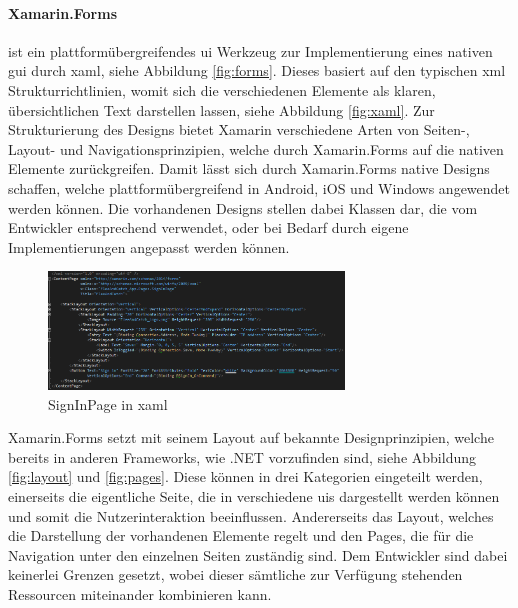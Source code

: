 \paragraph{Xamarin.Forms} ist ein plattformübergreifendes \gls{ui} Werkzeug zur Implementierung eines nativen \gls{gui} durch \gls{xaml}, siehe Abbildung \eqref{fig:forms}. Dieses basiert auf den typischen \gls{xml} Strukturrichtlinien, womit sich die verschiedenen Elemente als klaren, übersichtlichen Text darstellen lassen, siehe Abbildung \eqref{fig:xaml}. Zur Strukturierung des Designs bietet Xamarin verschiedene Arten von Seiten-, Layout- und Navigationsprinzipien, welche durch Xamarin.Forms auf die nativen Elemente zurückgreifen. Damit lässt sich durch Xamarin.Forms native Designs schaffen, welche plattformübergreifend in Android, iOS und Windows angewendet werden können. Die vorhandenen Designs stellen dabei Klassen dar, die vom Entwickler entsprechend verwendet, oder bei Bedarf durch eigene Implementierungen angepasst werden können.\\

\begin{figure}[h]
	\begin{center}
		\includegraphics[width=0.7\textwidth]{images/technische_grundlagen/xaml.png}
	\end{center}	
	\caption{SignInPage in \acrshort{xaml}}
	\label{fig:xaml}
\end{figure}

\newpage
\noindent
Xamarin.Forms setzt mit seinem Layout auf bekannte Designprinzipien, welche bereits in anderen Frameworks, wie .NET vorzufinden sind, siehe Abbildung \eqref{fig:layout} und \eqref{fig:pages}. Diese können in drei Kategorien eingeteilt werden, einerseits die eigentliche Seite, die in verschiedene \glspl{ui} dargestellt werden können und somit die Nutzerinteraktion beeinflussen. Andererseits das Layout, welches die Darstellung der vorhandenen Elemente regelt und den Pages, die für die Navigation unter den einzelnen Seiten zuständig sind. Dem Entwickler sind dabei keinerlei Grenzen gesetzt, wobei dieser sämtliche zur Verfügung stehenden Ressourcen miteinander kombinieren kann.

